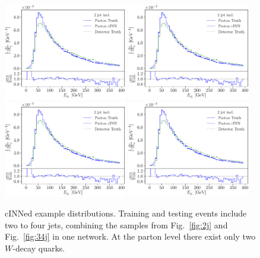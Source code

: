 \begin{figure}[t]
\includegraphics[page = 9, width=0.48\textwidth]{figures/cINN/isr_alljets_test}
\includegraphics[page =10, width=0.48\textwidth]{figures/cINN/isr_alljets_test} \\
\includegraphics[page =13, width=0.48\textwidth]{figures/cINN/isr_alljets_test}
\includegraphics[page =19, width=0.48\textwidth]{figures/cINN/isr_alljets_test}
\caption{cINNed example distributions. Training and testing events
  include two to four jets, combining the samples from
  Fig.~\ref{fig:2j} and Fig.~\ref{fig:34j} in one network. At the
  parton level there exist only two $W$-decay quarks.}
\label{fig:allj}
\end{figure}


